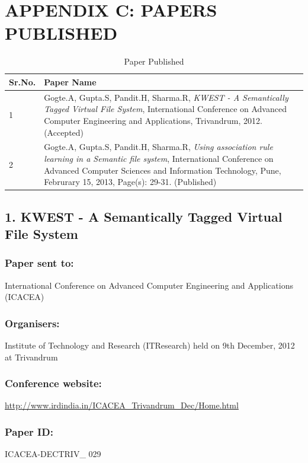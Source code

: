 \section{APPENDIX C: PAPERS PUBLISHED}

\begin{table}[h]
\begin{center}
\begin{tabular}{|p{1cm}|p{10cm}|}
\hline
\textbf{Sr.No.} & \textbf{Paper Name} \\ \hline
1 & Gogte.A, Gupta.S, Pandit.H, Sharma.R, \textit{KWEST - A Semantically Tagged Virtual File System}, International Conference on Advanced Computer Engineering and Applications, Trivandrum, 2012. (Accepted)\\
\hline
2 & Gogte.A, Gupta.S, Pandit.H, Sharma.R, \textit{Using association rule learning in a Semantic file system}, International Conference on Advanced Computer Sciences and Information Technology, Pune, Februrary 15, 2013, 
Page(s): 29-31. (Published)\\
\hline
\end{tabular}
\caption{Paper Published}
\end{center}
\label{tag:PP}
\end{table}

\subsection*{1. KWEST - A Semantically Tagged Virtual File System}

\subsubsection{Paper sent to:} International Conference on Advanced Computer Engineering and Applications (ICACEA)
\subsubsection{Organisers:} Institute of Technology and Research (ITResearch) held on 9th December, 2012 at Trivandrum
\subsubsection{Conference website:} \url{http://www.irdindia.in/ICACEA_Trivandrum_Dec/Home.html}
\hspace*{-1.5cm}
\subsubsection{Paper ID:} ICACEA-DECTRIV\_ 029
\newpage
